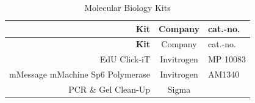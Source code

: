 \documentclass[11pt,singlespacinge,twoside]{reedthesis} %
\theoremstyle{definition}
\theoremstyle{definition}
\theoremstyle{definition}
\theoremstyle{remark}
\begin{document}
\begin{longtable}[]{@{}rcl@{}}
\caption{\label{tab:mat-mobikits} Molecular Biology Kits}\tabularnewline
\toprule
\begin{minipage}[b]{0.50\columnwidth}\raggedleft
\textbf{Kit}\strut
\end{minipage} & \begin{minipage}[b]{0.26\columnwidth}\centering
Company\strut
\end{minipage} & \begin{minipage}[b]{0.16\columnwidth}\raggedright
cat.-no.\strut
\end{minipage}\tabularnewline
\midrule
\endfirsthead
\toprule
\begin{minipage}[b]{0.50\columnwidth}\raggedleft
\textbf{Kit}\strut
\end{minipage} & \begin{minipage}[b]{0.26\columnwidth}\centering
Company\strut
\end{minipage} & \begin{minipage}[b]{0.16\columnwidth}\raggedright
cat.-no.\strut
\end{minipage}\tabularnewline
\midrule
\endhead
\begin{minipage}[t]{0.50\columnwidth}\raggedleft
EdU Click-iT\strut
\end{minipage} & \begin{minipage}[t]{0.26\columnwidth}\centering
Invitrogen\strut
\end{minipage} & \begin{minipage}[t]{0.16\columnwidth}\raggedright
MP 10083\strut
\end{minipage}\tabularnewline
\begin{minipage}[t]{0.50\columnwidth}\raggedleft
mMessage mMachine Sp6 Polymerase\strut
\end{minipage} & \begin{minipage}[t]{0.26\columnwidth}\centering
Invitrogen\strut
\end{minipage} & \begin{minipage}[t]{0.16\columnwidth}\raggedright
AM1340\strut
\end{minipage}\tabularnewline
\begin{minipage}[t]{0.50\columnwidth}\raggedleft
PCR \& Gel Clean-Up\strut
\end{minipage} & \begin{minipage}[t]{0.26\columnwidth}\centering
Sigma\strut
\end{minipage} & \begin{minipage}[t]{0.16\columnwidth}\raggedright

\end{minipage}
\end{longtable}
\end{document}

